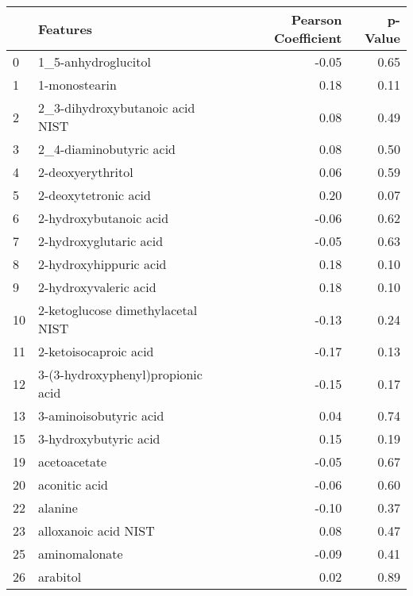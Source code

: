\begin{tabular}{llrr}
\toprule
{} &                           Features &  Pearson Coefficient &  p-Value \\
\midrule
0   &                1\_5-anhydroglucitol &                -0.05 &     0.65 \\
1   &                      1-monostearin &                 0.18 &     0.11 \\
2   &    2\_3-dihydroxybutanoic acid NIST &                 0.08 &     0.49 \\
3   &            2\_4-diaminobutyric acid &                 0.08 &     0.50 \\
4   &                  2-deoxyerythritol &                 0.06 &     0.59 \\
5   &               2-deoxytetronic acid &                 0.20 &     0.07 \\
6   &             2-hydroxybutanoic acid &                -0.06 &     0.62 \\
7   &             2-hydroxyglutaric acid &                -0.05 &     0.63 \\
8   &             2-hydroxyhippuric acid &                 0.18 &     0.10 \\
9   &              2-hydroxyvaleric acid &                 0.18 &     0.10 \\
10  &  2-ketoglucose dimethylacetal NIST &                -0.13 &     0.24 \\
11  &              2-ketoisocaproic acid &                -0.17 &     0.13 \\
12  &  3-(3-hydroxyphenyl)propionic acid &                -0.15 &     0.17 \\
13  &             3-aminoisobutyric acid &                 0.04 &     0.74 \\
15  &              3-hydroxybutyric acid &                 0.15 &     0.19 \\
19  &                       acetoacetate &                -0.05 &     0.67 \\
20  &                      aconitic acid &                -0.06 &     0.60 \\
22  &                            alanine &                -0.10 &     0.37 \\
23  &               alloxanoic acid NIST &                 0.08 &     0.47 \\
25  &                      aminomalonate &                -0.09 &     0.41 \\
26  &                           arabitol &                 0.02 &     0.89 \\

\end{tabular}
